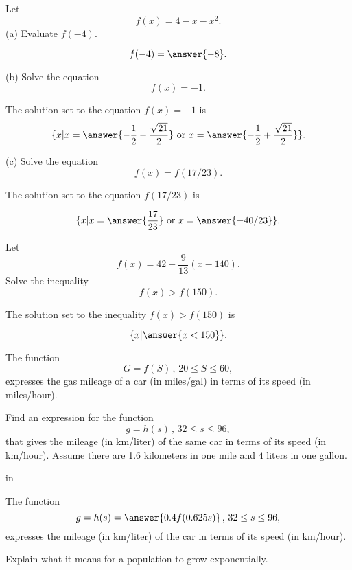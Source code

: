 \documentclass{ximera}
\newcommand{\pskip}{\vskip 0.1 in}
\begin{document}
\begin{question} \label{Qpdf0gbvgbrtg}
Let
\[
      f(x) = 4 - x - x^2 .
\]
(a) Evaluate $f(-4)$.

\[
    f(-4) = \answer{-8} .
\]

(b) Solve the equation 
\[
      f(x) = -1 .
\]

The solution set to the equation $f(x)=-1$ is
\[
  \{  x | x = \answer{-\frac{1}{2} - \frac{\sqrt{21}}{2}} \text{ or }  x = \answer{-\frac{1}{2} + \frac{\sqrt{21}}{2}}  \}.
\]

(c) Solve the equation
\[
       f(x) = f(17/23) .
\]

The solution set to the equation $f(17/23)$ is

\[
   \{  x | x = \answer{\frac{17}{23}} \text{ or } x=\answer{-40/23}  \}.
\]

\end{question}


\begin{question}  \label{Qdfdcg4tythyh5t}
Let 
\[
       f(x) = 42 - \frac{9}{13}(x - 140) .
\]
Solve the inequality
\[
     f(x) > f(150) .
\]

The solution set to the inequality $f(x)>f(150)$ is

\[
    \{  x | \answer{x < 150}  \}.
\]

\end{question}


\begin{question}  \label{Qdfb44t4w4333}
The function 
\[
  G = f(S) \, , \, 20\leq S \leq 60 ,
\]
expresses the gas mileage of a car (in miles/gal) in terms of its speed (in miles/hour).
 
Find an expression for the function 
\[
   g = h(s) \, , \, 32\leq s \leq 96 ,
\]
that gives the mileage (in km/liter) of the same car in terms of its speed (in km/hour). Assume there are 1.6 kilometers in one mile and $4$ liters in one gallon.

\pskip

The function 
\[
    g = h(s) =   \answer{0.4f(0.625s) } \, , \, 32\leq s \leq 96 ,
\]
expresses the mileage (in km/liter) of the car in terms of its speed (in km/hour). 

\end{question}


\begin{question}  \label{Eer5htrree}
Explain what it means for a population to grow exponentially.
\end{question}
\end{document}
